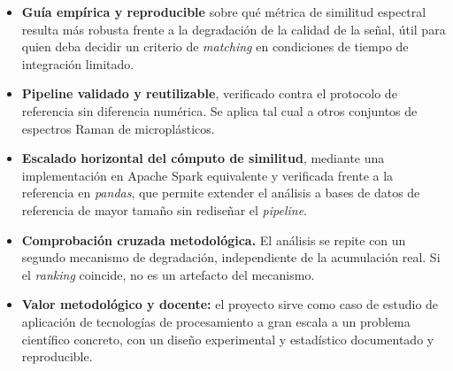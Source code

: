 \begin{itemize}
    \item \textbf{Guía empírica y reproducible} sobre qué métrica de similitud espectral resulta más robusta frente a la degradación de la calidad de la señal, útil para quien deba decidir un criterio de \textit{matching} en condiciones de tiempo de integración limitado.
    \item \textbf{Pipeline validado y reutilizable}, verificado contra el protocolo de referencia sin diferencia numérica. Se aplica tal cual a otros conjuntos de espectros Raman de microplásticos.
    \item \textbf{Escalado horizontal del cómputo de similitud}, mediante una implementación en Apache Spark equivalente y verificada frente a la referencia en \textit{pandas}, que permite extender el análisis a bases de datos de referencia de mayor tamaño sin rediseñar el \textit{pipeline}.
    \item \textbf{Comprobación cruzada metodológica.} El análisis se repite con un segundo mecanismo de degradación, independiente de la acumulación real. Si el \textit{ranking} coincide, no es un artefacto del mecanismo.
    \item \textbf{Valor metodológico y docente:} el proyecto sirve como caso de estudio de aplicación de tecnologías de procesamiento a gran escala a un problema científico concreto, con un diseño experimental y estadístico documentado y reproducible.
\end{itemize}
